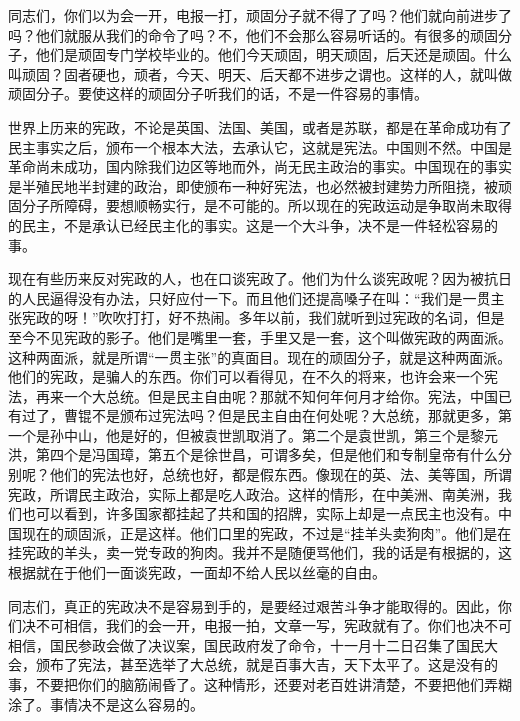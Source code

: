 同志们，你们以为会一开，电报一打，顽固分子就不得了了吗？他们就向前进步了吗？他们就服从我们的命令了吗？不，他们不会那么容易听话的。有很多的顽固分子，他们是顽固专门学校毕业的。他们今天顽固，明天顽固，后天还是顽固。什么叫顽固？固者硬也，顽者，今天、明天、后天都不进步之谓也。这样的人，就叫做顽固分子。要使这样的顽固分子听我们的话，不是一件容易的事情。

世界上历来的宪政，不论是英国、法国、美国，或者是苏联，都是在革命成功有了民主事实之后，颁布一个根本大法，去承认它，这就是宪法。中国则不然。中国是革命尚未成功，国内除我们边区等地而外，尚无民主政治的事实。中国现在的事实是半殖民地半封建的政治，即使颁布一种好宪法，也必然被封建势力所阻挠，被顽固分子所障碍，要想顺畅实行，是不可能的。所以现在的宪政运动是争取尚未取得的民主，不是承认已经民主化的事实。这是一个大斗争，决不是一件轻松容易的事。

现在有些历来反对宪政的人，也在口谈宪政了。他们为什么谈宪政呢？因为被抗日的人民逼得没有办法，只好应付一下。而且他们还提高嗓子在叫：“我们是一贯主张宪政的呀！”吹吹打打，好不热闹。多年以前，我们就听到过宪政的名词，但是至今不见宪政的影子。他们是嘴里一套，手里又是一套，这个叫做宪政的两面派。这种两面派，就是所谓“一贯主张”的真面目。现在的顽固分子，就是这种两面派。他们的宪政，是骗人的东西。你们可以看得见，在不久的将来，也许会来一个宪法，再来一个大总统。但是民主自由呢？那就不知何年何月才给你。宪法，中国已有过了，曹锟不是颁布过宪法吗？但是民主自由在何处呢？大总统，那就更多，第一个是孙中山，他是好的，但被袁世凯取消了。第二个是袁世凯，第三个是黎元洪，第四个是冯国璋，第五个是徐世昌，可谓多矣，但是他们和专制皇帝有什么分别呢？他们的宪法也好，总统也好，都是假东西。像现在的英、法、美等国，所谓宪政，所谓民主政治，实际上都是吃人政治。这样的情形，在中美洲、南美洲，我们也可以看到，许多国家都挂起了共和国的招牌，实际上却是一点民主也没有。中国现在的顽固派，正是这样。他们口里的宪政，不过是“挂羊头卖狗肉”。他们是在挂宪政的羊头，卖一党专政的狗肉。我并不是随便骂他们，我的话是有根据的，这根据就在于他们一面谈宪政，一面却不给人民以丝毫的自由。

同志们，真正的宪政决不是容易到手的，是要经过艰苦斗争才能取得的。因此，你们决不可相信，我们的会一开，电报一拍，文章一写，宪政就有了。你们也决不可相信，国民参政会做了决议案，国民政府发了命令，十一月十二日召集了国民大会，颁布了宪法，甚至选举了大总统，就是百事大吉，天下太平了。这是没有的事，不要把你们的脑筋闹昏了。这种情形，还要对老百姓讲清楚，不要把他们弄糊涂了。事情决不是这么容易的。

